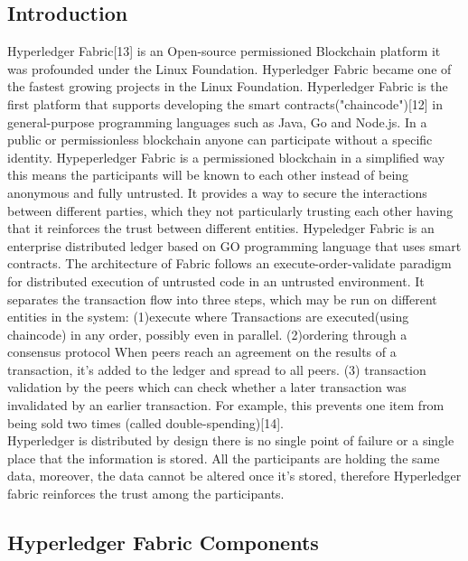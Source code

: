\subsection{Introduction}
Hyperledger Fabric[13] is an Open-source permissioned Blockchain platform it was profounded under the Linux Foundation. Hyperledger Fabric became one of the fastest growing projects in the Linux Foundation. 
Hyperledger Fabric is the first platform that supports developing the smart contracts("chaincode")[12] in general-purpose programming languages such as Java, Go and Node.js.
In a public or permissionless blockchain anyone can participate without a specific identity. Hypeperledger Fabric is a permissioned blockchain in a simplified way this means the participants will be known to each other instead of being anonymous and fully untrusted. 
It provides a way to secure the interactions between different parties, which they not particularly trusting each other having that it reinforces the trust between different entities.
Hypeledger Fabric is an enterprise distributed ledger based on GO programming language that uses smart contracts. 
The architecture of Fabric follows an execute-order-validate paradigm for distributed execution of untrusted code in an untrusted environment. It separates the transaction flow into three steps, which may be run on different entities in the system: (1)execute where Transactions are executed(using chaincode) in any order, possibly even in parallel. (2)ordering through a consensus protocol When peers reach an agreement on the results of a transaction, it’s added to the ledger and spread to all peers. (3) transaction validation by the peers which can check whether a later transaction was invalidated by an earlier transaction. For example, this prevents one item from being sold two times (called double-spending)[14].\\ 

Hyperledger is distributed by design there is no single point of failure or a single place that the information is stored.
All the participants are holding the same data, moreover, the data cannot be altered once it's stored, therefore Hyperledger fabric reinforces the trust among the participants.


\subsection{Hyperledger Fabric Components} 


